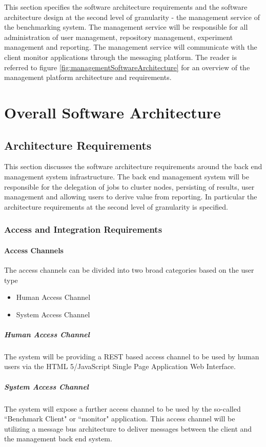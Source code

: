 This section specifies the software architecture requirements and the software
architecture design at the second level of granularity - the management service
of the benchmarking system. The management service will be responsible for all
administration of user management, repository management, experiment management
and reporting. The management service will communicate with the client monitor 
applications through the messaging platform. The reader is referred to
figure \ref{fig:managementSoftwareArchitecture} for an overview of the
management platform architecture and requirements. 

\section{Overall Software Architecture}
\subsection{Architecture Requirements}
This section discusses the software architecture requirements around the
back end management system infrastructure. The back end management system will be
responsible for the delegation of jobs to cluster nodes, persisting of results,
user management and allowing users to derive value from reporting. In particular
the architecture requirements at the second level of granularity is specified.

\subsubsection{Access and Integration Requirements}
\label{sec:accessIntegrationRequirementsManagementSystem}
\paragraph*{Access Channels}
The access channels can be divided into two broad categories based on the user type
\begin{itemize}
	\item Human Access Channel
	\item System Access Channel
\end{itemize}

\subparagraph*{Human Access Channel}
\label{sec:humanAccessChannelManagementSystem}
The system will be providing a REST based access channel to be used by human
users via the HTML 5/JavaScript Single Page Application Web Interface.

\subparagraph*{System Access Channel}
The system will expose a further access channel to be used by the so-called
``Benchmark Client" or ``monitor" application. This access channel will be
utilizing a message bus architecture to deliver messages between the client
and the management back end system.

